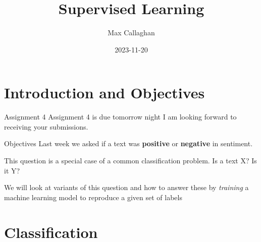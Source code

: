 \documentclass[
  10pt,
  ignorenonframetext,
  aspectratio=169]{beamer}
\title{Supervised Learning}
\author{Max Callaghan}
\date{2023-11-20}
\begin{document}
\frame{\titlepage}

\hypertarget{introduction-and-objectives}{%
\section{Introduction and
Objectives}\label{introduction-and-objectives}}

\begin{frame}{Assignment 4}
\protect\hypertarget{assignment-4}{}
Assignment 4 is due tomorrow night I am looking forward to receiving
your submissions.
\end{frame}

\begin{frame}{Objectives}
\protect\hypertarget{objectives}{}
Last week we asked if a text was \textbf{positive} or \textbf{negative}
in sentiment.

This question is a special case of a common classification problem. Is a
text X? Is it Y?

We will look at variants of this question and how to answer these by
\emph{training} a machine learning model to reproduce a given set of
labels
\end{frame}

\hypertarget{classification}{%
\section{Classification}\label{classification}}
\end{document}
